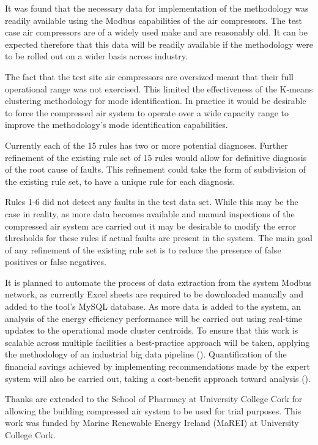 It was found that the necessary data for implementation of the methodology was readily available using the Modbus capabilities of the air compressors. The test case air compressors are of a widely used make and are reasonably old. It can be expected therefore that this data will be readily available if the methodology were to be rolled out on a wider basis across industry. 

The fact that the test site air compressors are oversized meant that their full operational range was not exercised. This limited the effectiveness of the K-means clustering methodology for mode identification. In practice it would be desirable to force the compressed air system to operate over a wide capacity range to improve the methodology's mode identification capabilities.

Currently each of the 15 rules has two or more potential diagnoses. Further refinement of the existing rule set of 15 rules would allow for definitive diagnosis of the root cause of faults. This refinement could take the form of subdivision of the existing rule set, to have a unique rule for each diagnosis. 

Rules 1-6 did not detect any faults in the test data set. While this may be the case in reality, as more data becomes available and manual inspections of the compressed air system are carried out it may be desirable to modify the error thresholds for these rules if actual faults are present in the system. The main goal of any refinement of the existing rule set is to reduce the presence of false positives or false negatives.

It is planned to automate the process of data extraction from the system Modbus network, as currently Excel sheets are required to be downloaded manually and added to the tool's MySQL database. As more data is added to the system, an analysis of the energy efficiency performance will be carried out using real-time updates to the operational mode cluster centroids. To ensure that this work is scalable across multiple facilities a best-practice approach will be taken, applying the methodology of an industrial big data pipeline (\cite{ODonovan2015a}). Quantification of the financial savings achieved by implementing recommendations made by the expert system will also be carried out, taking a cost-benefit approach toward analysis (\cite{Walsh2013}).


\begin{acknowledgements}
Thanks are extended to the School of Pharmacy at University College Cork for allowing the building compressed air system to be used for trial purposes. This work was funded by Marine Renewable Energy Ireland (MaREI) at University College Cork.
\end{acknowledgements}

